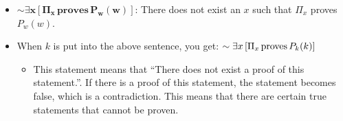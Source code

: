 \documentclass{article}
\begin{document}
\begin{itemize}
\begin{itemize}
        \item \(\bm{\sim\exists x\left[\Pi_x\,\textbf{proves}\,P_w(w)\right]}\): There does not exist an \(x\) such that \(\Pi_x\) proves \(P_w(w)\).
        \item When \(k\) is put into the above sentence, you get: \(\sim\exists x\left[\Pi_x\,\textnormal{proves}\,P_k(k)\right]\)
        \begin{itemize}
            \item This statement means that ``There does not exist a proof of this statement.''. If there is a proof of this statement, the statement becomes false, which is a contradiction. This means that there are certain true statements that cannot be proven.
        \end{itemize}
    \end{itemize}
\end{itemize}
\end{document}
